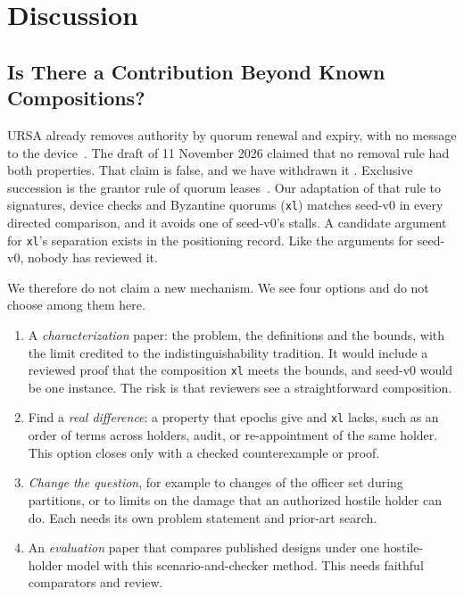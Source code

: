\section{Discussion}
\label{sec:discussion}

\subsection{Is There a Contribution Beyond Known Compositions?}
\label{sec:memo}

URSA already removes authority by quorum renewal and expiry, with no message to the
device~\cite{luo2004ursa}. The draft of 11 November 2026 claimed that no removal rule had
both properties. That claim is false, and we have withdrawn it . Exclusive succession is
the grantor rule of quorum leases~\cite{vanrenesse2011nerio}. Our adaptation of that rule
to signatures, device checks and Byzantine quorums (\texttt{xl}) matches seed-v0 in every
directed comparison, and it avoids one of seed-v0's stalls. A candidate argument for
\texttt{xl}'s separation exists in the positioning record. Like the arguments for seed-v0,
nobody has reviewed it.

We therefore do not claim a new mechanism. We see four options and do not choose among
them here.
\begin{enumerate}
  \item A \emph{characterization} paper: the problem, the definitions and the bounds, with
  the limit credited to the indistinguishability tradition. It would include a reviewed
  proof that the composition \texttt{xl} meets the bounds, and seed-v0 would be one
  instance. The risk is that reviewers see a straightforward composition.
  \item Find a \emph{real difference}: a property that epochs give and \texttt{xl} lacks,
  such as an order of terms across holders, audit, or re-appointment of the same holder.
  This option closes only with a checked counterexample or proof.
  \item \emph{Change the question}, for example to changes of the officer set during
  partitions, or to limits on the damage that an authorized hostile holder can do. Each
  needs its own problem statement and prior-art search.
  \item An \emph{evaluation} paper that compares published designs under one
  hostile-holder model with this scenario-and-checker method. This needs faithful
  comparators and review.
\end{enumerate}

